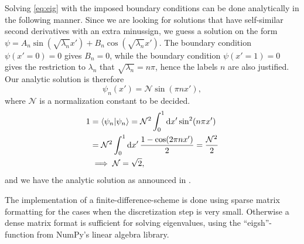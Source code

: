 Solving \cref{eq:eig} with the imposed boundary conditions can be done analytically in the following manner.
Since we are looking for solutions that have self-similar second derivatives with an extra minussign, we guess a solution on the form 
$\psi = A_n\sin(\sqrt{\lambda_n}x') + B_n\cos(\sqrt{\lambda_n}x')$. The boundary condition $\psi(x'=0) = 0$ gives $B_n = 0$, while the boundary condition $\psi(x'=1) = 0$ gives the restriction to $\lambda_n$ that $\sqrt{\lambda_n} = n\pi$, hence the labels $n$ are also justified. Our analytic solution is therefore 
\begin{equation}
\label{eq:eigenfunc}
\psi_n(x') = \mathcal{N}\sin(\pi n x'),
\end{equation} 
where $\mathcal{N}$ is a normalization constant to be decided.
\begin{align*} 
1 &= \braket{\psi_n}{\psi_n} = \mathcal{N}^2\int_{0}^{1}\dd{x'}\sin[2](n\pi x') \\
&=\mathcal{N}^2\int_0^1\dd{x'}\frac{1-\cos(2\pi n x')}{2}
= \frac{\mathcal{N}^2}{2} \\
&\implies \mathcal{N} = \sqrt{2},
\end{align*}
and we have the analytic solution as announced in \cite{assignment}.

The implementation of a finite-difference-scheme is done using sparse matrix formatting for the cases when the discretization step is very small. Otherwise a dense matrix format is sufficient for solving eigenvalues, using the ``eigsh''-function from NumPy's linear algebra library.

